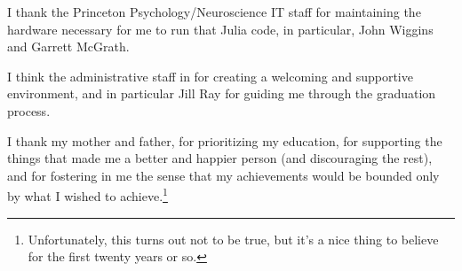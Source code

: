 I thank the Princeton Psychology/Neuroscience IT staff for maintaining the hardware necessary for me to run that Julia code, in particular, John Wiggins and Garrett McGrath.

I think the administrative staff in for creating a welcoming and supportive environment, and in particular Jill Ray for guiding me through the graduation process.

I thank my mother and father, for prioritizing my education, for supporting the things that made me a better and happier person (and discouraging the rest),  and for fostering in me the sense that my achievements would be bounded only by what I wished to achieve.\footnote{%
  Unfortunately, this turns out not to be true, but it's a nice thing to believe for the first twenty years or so.
}












